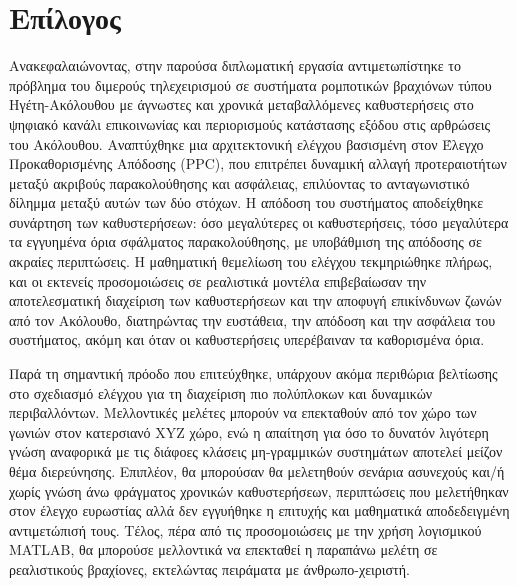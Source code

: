 \chapter{Επίλογος} \label{Chapter4}
Ανακεφαλαιώνοντας, στην παρούσα διπλωματική εργασία αντιμετωπίστηκε το πρόβλημα του διμερούς τηλεχειρισμού σε συστήματα ρομποτικών βραχιόνων τύπου Ηγέτη-Ακόλουθου με άγνωστες και χρονικά μεταβαλλόμενες καθυστερήσεις στο ψηφιακό κανάλι επικοινωνίας και περιορισμούς κατάστασης εξόδου στις αρθρώσεις του Ακόλουθου. Αναπτύχθηκε μια αρχιτεκτονική ελέγχου βασισμένη στον Έλεγχο Προκαθορισμένης Απόδοσης (PPC), που επιτρέπει δυναμική αλλαγή προτεραιοτήτων μεταξύ ακριβούς παρακολούθησης και ασφάλειας, επιλύοντας το ανταγωνιστικό δίλημμα μεταξύ αυτών των δύο στόχων. Η απόδοση του συστήματος αποδείχθηκε συνάρτηση των καθυστερήσεων: όσο μεγαλύτερες οι καθυστερήσεις, τόσο μεγαλύτερα τα εγγυημένα όρια σφάλματος παρακολούθησης, με υποβάθμιση της απόδοσης σε ακραίες περιπτώσεις. Η μαθηματική θεμελίωση του ελέγχου τεκμηριώθηκε πλήρως, και οι εκτενείς προσομοιώσεις σε ρεαλιστικά μοντέλα επιβεβαίωσαν την αποτελεσματική διαχείριση των καθυστερήσεων και την αποφυγή επικίνδυνων ζωνών από τον Ακόλουθο, διατηρώντας την ευστάθεια, την απόδοση και την ασφάλεια του συστήματος, ακόμη και όταν οι καθυστερήσεις υπερέβαιναν τα καθορισμένα όρια.

\bigskip
Παρά τη σημαντική πρόοδο που επιτεύχθηκε, υπάρχουν ακόμα περιθώρια βελτίωσης στο σχεδιασμό ελέγχου για τη διαχείριση πιο πολύπλοκων και δυναμικών περιβαλλόντων. Μελλοντικές μελέτες μπορούν να επεκταθούν από τον χώρο των γωνιών στον κατερσιανό XYZ χώρο, ενώ η απαίτηση για όσο το δυνατόν λιγότερη γνώση αναφορικά με τις διάφοες κλάσεις μη-γραμμικών συστημάτων αποτελεί μείζον θέμα διερεύνησης. Επιπλέον, θα μπορούσαν θα μελετηθούν σενάρια ασυνεχούς και/ή χωρίς γνώση άνω φράγματος χρονικών καθυστερήσεων, περιπτώσεις που μελετήθηκαν στον έλεγχο ευρωστίας αλλά δεν εγγυήθηκε η επιτυχής και μαθηματικά αποδεδειγμένη αντιμετώπισή τους. Τέλος, πέρα από τις προσομοιώσεις με την χρήση λογισμικού MATLAB, θα μπορούσε μελλοντικά να επεκταθεί η παραπάνω μελέτη σε ρεαλιστικούς βραχίονες, εκτελώντας πειράματα με άνθρωπο-χειριστή. 
